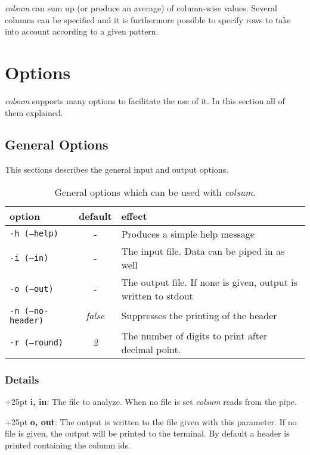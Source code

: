 \documentclass[a4paper,10pt,parskip=half]{scrreprt}
\begin{document}
\textit{colsum} can sum up (or produce an average) of column-wise values. Several columns can be specified and it is furthermore possible to specify rows to take into account according to a given pattern.

\section{Options}

\textit{colsum} supports many options to facilitate the use of it. In this section all of them explained.

\subsection{General Options}

This sections describes the general input and output options.

\begin{table}[h]
\caption{General options which can be used with \textit{colsum}.}
\begin{tabular}{lcp{7cm}}\hline
option& default & effect \\\hline
 \texttt{-h (--help)}&- & Produces a simple help message\\
 \texttt{-i (--in)} &-& The input file. Data can be piped in as well\\
 \texttt{-o (--out)} &-& The output file. If none is given, output is written to stdout\\
 \texttt{-n (--no-header)} &\textit{false} & Suppresses the printing of the header\\ 
 \texttt{-r (--round)} & \textit 2 & The number of digits to print after decimal point.\\\hline
 \end{tabular}
\end{table}

\subsubsection{Details}

\hangindent+25pt 
\textbf{i, in}: The file to analyze. When no file is set \textit{colsum} reads from the pipe.

\hangindent+25pt 
\textbf{o, out}: The output is written to the file given with this parameter. If no file is given, the output will be printed to the terminal. By default a header is printed containing the column ids. 
\end{document}
